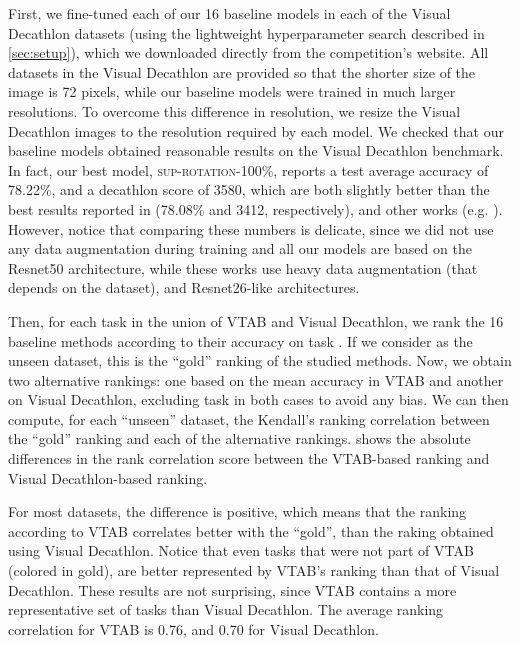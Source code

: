 \documentclass{article}
\begin{document}
First, we fine-tuned each of our 16 baseline models in each of the Visual 
Decathlon datasets (using the lightweight hyperparameter search described in \cref{sec:setup}),
which we downloaded directly from the competition's website. All datasets in the 
Visual Decathlon are provided so that the shorter size of the image is 72 pixels, 
while our baseline models were trained in much larger resolutions.
To overcome this difference in resolution, 
we resize the Visual Decathlon images to the resolution required by each model.
We checked that our baseline models obtained reasonable results on the Visual Decathlon 
benchmark. In fact, our best model,
\textsc{sup-rotation-100\%}, reports a test average accuracy of 78.22\%, and a decathlon score
of 3580, which are both slightly better than the best results reported in
\cite{rebuffi2018} (78.08\% and 3412, respectively), and other works
(e.g. \cite{rebuffi2017,rosenfeld2018incremental}). However, notice that comparing
these numbers is delicate, since we did not use any data augmentation during
training and all our models
are based on the Resnet50 architecture, while these works use heavy data augmentation
(that depends on the dataset), and Resnet26-like architectures.

Then, for each task  in the union of VTAB and Visual Decathlon, we rank the 16 baseline
methods according to their accuracy on task . If we consider  as the unseen dataset,
this is the ``gold'' ranking of the studied methods. Now, we obtain two alternative
rankings: one based on the mean accuracy in VTAB and another on Visual Decathlon,
excluding task  in both cases to avoid any bias.
We can then compute, for each ``unseen'' dataset, the Kendall's ranking correlation
between the ``gold'' ranking and each of the alternative rankings.
 shows the absolute differences in the
rank correlation score between the VTAB-based ranking and Visual Decathlon-based ranking.


For most datasets, the difference is positive, which means that the ranking according to
VTAB correlates better with the ``gold'', than the raking obtained using Visual Decathlon.
Notice that even tasks that were not part of VTAB (colored in gold), are better represented
by VTAB's ranking than that of Visual Decathlon. These results are not surprising, since VTAB
contains a more representative set of tasks than Visual Decathlon.
The average ranking correlation for VTAB is 0.76, and 0.70 for Visual Decathlon.

 
\end{document}
